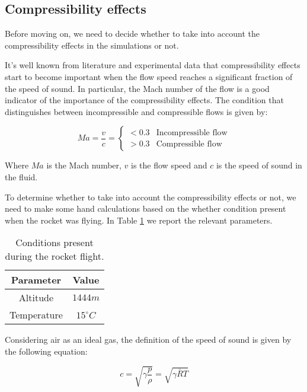 \subsection{Compressibility effects}
\label{subsec:compressibility_effects}

Before moving on, we need to decide whether to take into account the compressibility effects in the simulations or not.

It's well known from literature and experimental data that compressibility effects start to become important when the flow speed reaches a significant fraction of the speed of sound.
In particular, the Mach number of the flow is a good indicator of the importance of the compressibility effects.
The condition that distinguishes between incompressible and compressible flows is given by:

\begin{equation}
    Ma = \frac{v}{c} = \begin{cases}
        < 0.3 & \text{Incompressible flow} \\
        > 0.3 & \text{Compressible flow}
    \end{cases}
    \label{eq:mach_number}
\end{equation}

Where $Ma$ is the Mach number, $v$ is the flow speed and $c$ is the speed of sound in the fluid.

To determine whether to take into account the compressibility effects or not, we need to make some hand calculations based on the whether condition present when the rocket was flying.
In Table \ref{tab:conditions} we report the relevant parameters.

\begin{table}[H]
    \centering
    \begin{tabular}{|c|c|}
        \hline
        \textbf{Parameter} & \textbf{Value} \\
        \hline
        Altitude           & $1444m$        \\
        Temperature        & $15^{\circ}C$  \\
        \hline
    \end{tabular}
    \caption{Conditions present during the rocket flight.}
    \label{tab:conditions}
\end{table}

Considering air as an ideal gas, the definition of the speed of sound is given by the following equation:

\begin{equation}
    c = \sqrt{\gamma \frac{p}{\rho}} = \sqrt{\gamma \bar{R} T}
    \label{eq:speed_of_sound}
\end{equation}

